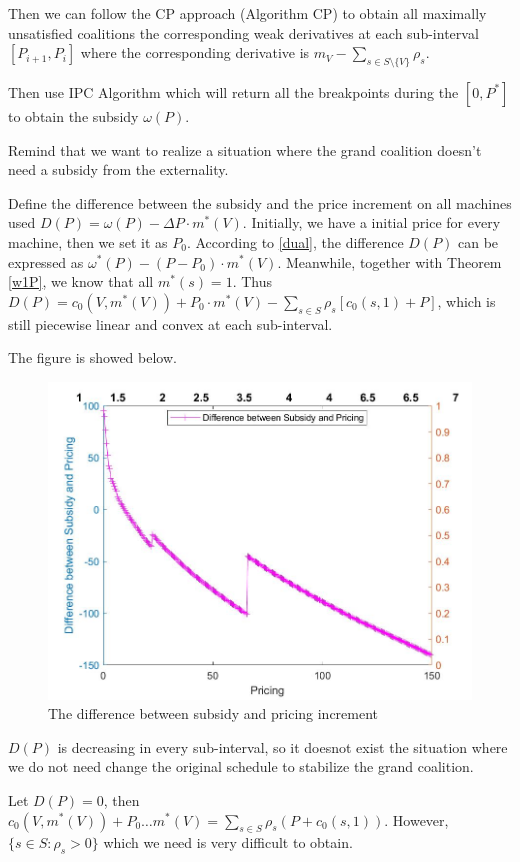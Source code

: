 Then we can follow the CP approach (Algorithm CP) to obtain all maximally unsatisfied coalitions the corresponding weak derivatives at each sub-interval $[P_{i+1},P_{i}]$ where the corresponding derivative is $m_V-\sum_{s\in S\setminus\{V\}} \rho_s$.

Then use IPC Algorithm which will return all the breakpoints during the $[0, P^*]$ to obtain the subsidy $\omega(P)$.

Remind that we want to realize a situation where the grand coalition doesn't need a subsidy from the externality.

Define the difference between the subsidy and the price increment on all machines used $D(P) = \omega(P) - \Delta P\cdot m^*(V)$. Initially, we have a initial price for every machine, then we set it as $P_0$.
According to \ref{dual}, the difference $D(P)$ can be expressed as $\omega^*(P) - (P-P_0)\cdot m^*(V)$. Meanwhile, together with Theorem \ref{w1P}, we know that all $m^*(s) =1$. Thus $D(P) = c_0(V, m^*(V)) + P_0 \cdot m^*(V) - \sum_{s\in S}\rho_s[c_0(s, 1) + P]$, which is still piecewise linear and convex at each sub-interval.

The figure is showed below.
\begin{figure}[h]%
	\centering  %
	\includegraphics[width=0.8\linewidth]{Figures/Imagediff}  %
	\caption{The difference between subsidy and pricing increment}  %
	\label{fig:Imagediff}   %
\end{figure}

$D(P)$ is decreasing in every sub-interval, so it doesnot exist the situation where we do not need change the original schedule to stabilize the grand coalition.

Let $D(P) = 0$, then $c_0(V, m^*(V)) + P_0 \dots m^*(V) = \sum_{s \in S} \rho_s (P + c_0(s,1))$. However, $\{s\in S: \rho_s > 0\}$ which we need is very difficult to obtain.

